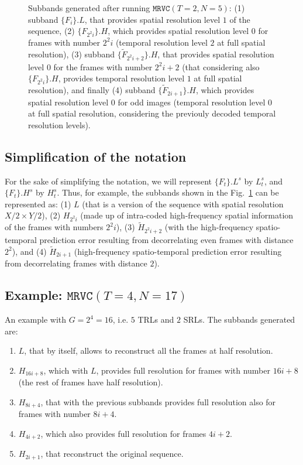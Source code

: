 \begin{figure}
  \centering
  \caption{Subbands generated after running $\mathtt{MRVC}(T=2, N=5)$:
    (1) subband $\{F_i\}.L$, that provides spatial resolution level
    $1$ of the sequence, (2) $\{F_{2^2i}\}.H$, which provides spatial
    resolution level $0$ for frames with number $2^2i$ (temporal
    resolution level $2$ at full spatial resolution), (3) subband
    $\{{\tilde F}_{2^2i+2}\}.H$, that provides spatial resolution
    level $0$ for the frames with number $2^2i+2$ (that considering
    also $\{F_{2^2i}\}.H$, provides temporal resolution level $1$ at
    full spatial resolution), and finally (4) subband $\{{\tilde
      F}_{2i+1}\}.H$, which provides spatial resolution level $0$ for
    odd images (temporal resolution level $0$ at full spatial
    resolution, considering the previouly decoded temporal resolution
    levels).}
  \label{fig:1xMRVC2}
\end{figure}


\subsection{Simplification of the notation}

For the sake of simplifying the notation, we will represent
$\{F_t\}.L^s$ by $L_t^s$, and $\{F_t\}.H^s$ by $H_t^s$. Thus, for
example, the subbands shown in the Fig.~\ref{fig:1xMRVC2} can be
represented as: (1) $L$ (that is a version of the sequence with
spatial resolution $X/2\times Y/2$), (2) $H_{2^2i}$ (made up of
intra-coded high-frequency spatial information of the frames with
numbers $2^2i$), (3) $\tilde{H}_{2^2i+2}$ (with the high-frequency
spatio-temporal prediction error resulting from decorrelating even
frames with distance $2^2$), and (4) $\tilde{H}_{2i+1}$
(high-frequency spatio-temporal prediction error resulting from
decorrelating frames with distance $2$).


\subsection{Example: $\mathtt{MRVC}(T=4, N=17)$}

An example with $G=2^4=16$, i.e. $5$ TRLs and $2$ SRLs. The subbands
generated are:
\begin{enumerate}
\item $L$, that by itself, allows to reconstruct all the frames at
  half resolution.
\item $H_{16i+8}$, which with $L$, provides full resolution for frames
  with number $16i+8$ (the rest of frames have half resolution).
\item $H_{8i+4}$, that with the previous subbands provides full
  resolution also for frames with number $8i+4$.
\item $H_{4i+2}$, which also provides full resolution for frames $4i+2$.
\item $H_{2i+1}$, that reconstruct the original sequence.
\end{enumerate}

